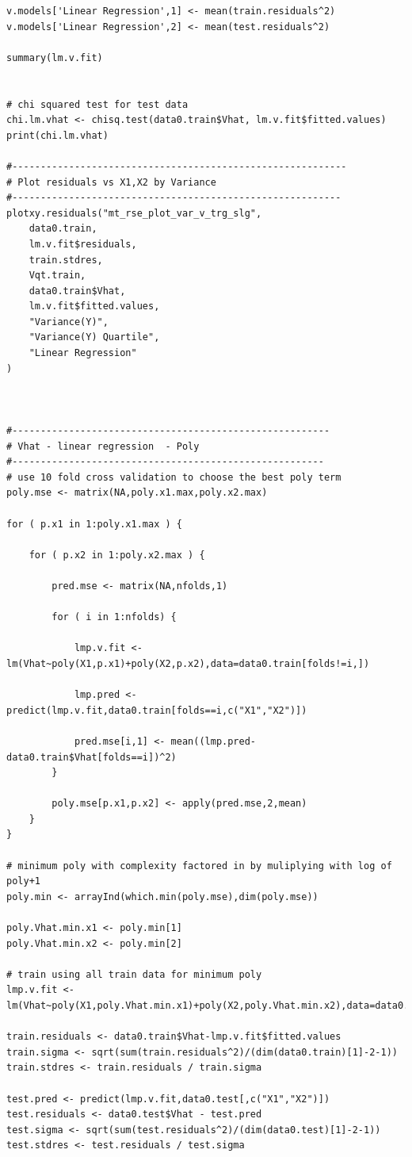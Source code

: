 \documentclass[twoside,12pt]{article}
\begin{document}
\begin{verbatim}
v.models['Linear Regression',1] <- mean(train.residuals^2)
v.models['Linear Regression',2] <- mean(test.residuals^2)

summary(lm.v.fit)


# chi squared test for test data
chi.lm.vhat <- chisq.test(data0.train$Vhat, lm.v.fit$fitted.values)
print(chi.lm.vhat)

#-----------------------------------------------------------
# Plot residuals vs X1,X2 by Variance
#----------------------------------------------------------
plotxy.residuals("mt_rse_plot_var_v_trg_slg",
	data0.train,
	lm.v.fit$residuals,
	train.stdres,
	Vqt.train,
	data0.train$Vhat,
	lm.v.fit$fitted.values,
	"Variance(Y)",
	"Variance(Y) Quartile",
	"Linear Regression"
)



#--------------------------------------------------------
# Vhat - linear regression  - Poly
#-------------------------------------------------------
# use 10 fold cross validation to choose the best poly term
poly.mse <- matrix(NA,poly.x1.max,poly.x2.max)

for ( p.x1 in 1:poly.x1.max ) {

	for ( p.x2 in 1:poly.x2.max ) {

		pred.mse <- matrix(NA,nfolds,1)

		for ( i in 1:nfolds) {
	
			lmp.v.fit <- lm(Vhat~poly(X1,p.x1)+poly(X2,p.x2),data=data0.train[folds!=i,])
		
			lmp.pred <- predict(lmp.v.fit,data0.train[folds==i,c("X1","X2")])

			pred.mse[i,1] <- mean((lmp.pred-data0.train$Vhat[folds==i])^2)
		}

		poly.mse[p.x1,p.x2] <- apply(pred.mse,2,mean)
	}
}

# minimum poly with complexity factored in by muliplying with log of poly+1
poly.min <- arrayInd(which.min(poly.mse),dim(poly.mse))

poly.Vhat.min.x1 <- poly.min[1]
poly.Vhat.min.x2 <- poly.min[2]

# train using all train data for minimum poly
lmp.v.fit <- lm(Vhat~poly(X1,poly.Vhat.min.x1)+poly(X2,poly.Vhat.min.x2),data=data0.train)

train.residuals <- data0.train$Vhat-lmp.v.fit$fitted.values
train.sigma <- sqrt(sum(train.residuals^2)/(dim(data0.train)[1]-2-1))
train.stdres <- train.residuals / train.sigma

test.pred <- predict(lmp.v.fit,data0.test[,c("X1","X2")])
test.residuals <- data0.test$Vhat - test.pred
test.sigma <- sqrt(sum(test.residuals^2)/(dim(data0.test)[1]-2-1))
test.stdres <- test.residuals / test.sigma


\end{verbatim}
\end{document}
